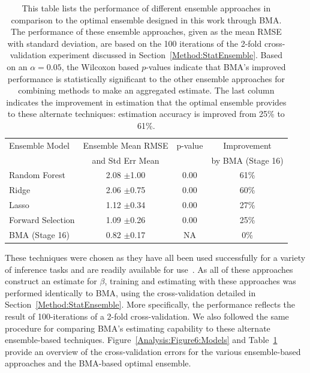 \documentclass[journal=jpcbfk, manuscript=article]{achemso}
\newcommand{\+}[1]{\ensuremath{\mathbf{#1}}}
\newcommand{\rev}[1]{#1}
\begin{document}
\begin{table}[t!]
	\centering
	\caption[Model comparison with mean RMSE]{This table lists the performance of different ensemble approaches in comparison to the optimal ensemble designed in this work through BMA.
	The performance of these ensemble approaches, given as the mean \rev{RMSE} with standard deviation, are based on the 100 iterations of the 2-fold cross-validation experiment discussed in Section~\ref{Method:StatEnsemble}.
	Based on an $\alpha = 0.05$, the Wilcoxon based $p$-values indicate that BMA's improved performance is statistically significant to the other ensemble approaches for combining methods to make an aggregated estimate.
	The last column indicates the improvement in estimation that the optimal ensemble provides to these alternate techniques: estimation accuracy is improved from 25\% to 61\%. }
	\footnotesize
	\begin{tabular}{lccc}
		\hline
		\hline
		Ensemble Model  & Ensemble Mean RMSE  & p-value & Improvement\\
		 & and Std \rev{Err Mean}& & by BMA (Stage 16)\\
		\hline
		Random Forest & 2.08 $\pm$1.00 & 0.00 & 61\%\\
		Ridge & 2.06 $\pm$0.75 & 0.00 & 60\%\\
		Lasso & 1.12 $\pm$0.34 & 0.00 & 27\%\\
		Forward Selection & 1.09 $\pm$0.26 & 0.00 &  25\%\\		
		BMA (Stage 16) & 0.82 $\pm$0.17 & NA & 0\%\\
		\hline
		\hline
	\end{tabular}
	\label{Analysis:Table4:EnsembleCompare}
\end{table}
These techniques were chosen as they have all been used successfully for a variety of inference tasks and are readily available for use~\cite{R:2008,sklearn_api:2013}.
\rev{As all of these approaches construct an estimate for $\beta$, training and estimating with these approaches was performed identically to BMA, using the cross-validation detailed in Section~\ref{Method:StatEnsemble}.
More specifically, the performance reflects the result of 100-iterations of a 2-fold cross-validation.
We also followed the same procedure for comparing BMA's estimating capability to these alternate ensemble-based techniques.}
Figure~\ref{Analysis:Figure6:Models} and Table~\ref{Analysis:Table4:EnsembleCompare} provide an overview of the cross-validation errors for the various ensemble-based approaches and the BMA-based optimal ensemble.
\end{document}
